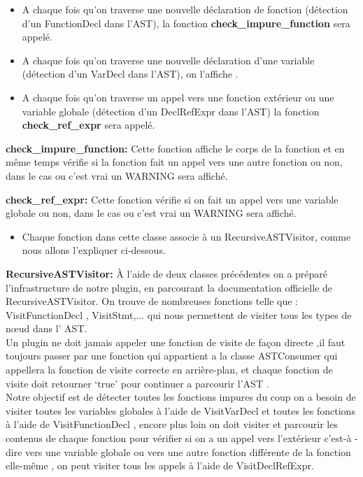 \documentclass[12pt,titlepage]{article}
\begin{document}
\begin{itemize}
\item A chaque fois qu’on traverse une nouvelle déclaration de fonction (détection d’un FunctionDecl dans l’AST), la fonction \textbf{check\_impure\_function}  sera appelé.
\item A chaque fois qu’on traverse une nouvelle déclaration d’une variable (détection d’un VarDecl dans l’AST), on l’affiche .
 \item A chaque fois qu’on traverse un appel vers une fonction extérieur ou une variable globale (détection d’un DeclRefExpr dans l’AST) la fonction \textbf{ check\_ref\_expr} sera appelé.
 \end{itemize}

\textbf{check\_impure\_function:}
 Cette fonction affiche le corps de la fonction et en même temps vérifie si la fonction fait un appel vers une autre fonction ou non, dans le cas ou c’est vrai un WARNING sera affiché. 

\textbf{check\_ref\_expr:}	
 Cette fonction vérifie si on fait un appel vers une variable globale ou non, dans le cas ou c’est vrai un WARNING sera affiché. 
\begin{itemize}
\item Chaque fonction dans cette classe associe à un RecursiveASTVisitor, comme nous allons l’expliquer ci-dessous.
\end{itemize}

\textbf{RecursiveASTVisitor:}
À l’aide de deux classes précédentes on a préparé l’infrastructure de notre plugin,  en parcourant  la documentation officielle de RecursiveASTVisitor. On trouve de nombreuses fonctions  telle que :  VisitFunctionDecl , VisitStmt,... qui nous  permettent de visiter tous les types de nœud dans l’ AST.\\
Un plugin ne doit jamais appeler une fonction de visite de façon directe ,il faut toujours passer par une fonction qui appartient a  la classe ASTConsumer qui appellera la fonction de visite correcte en arrière-plan, et chaque fonction de visite doit retourner ‘true’ pour continuer a parcourir l’AST  . \\

Notre objectif est de détecter toutes les fonctions impures du coup on a besoin de visiter toutes les variables globales à l’aide  de  VisitVarDecl et toutes les fonctions à l’aide de VisitFunctionDecl , encore plus loin on doit visiter et parcourir les contenus de chaque fonction pour vérifier si on a un appel vers l’extérieur c’est-à -dire vers une variable globale ou vers une autre fonction différente de la fonction elle-même , on peut visiter tous les appels à l’aide de VisitDeclRefExpr.\\
\end{document}

